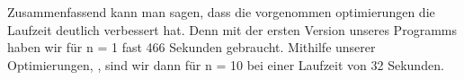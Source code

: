 Zusammenfassend kann man sagen, dass die vorgenommen optimierungen die Laufzeit deutlich verbessert hat.
Denn mit der ersten Version unseres Programms haben wir für n = 1 fast 466 Sekunden gebraucht.
Mithilfe unserer Optimierungen, , sind wir dann für n = 10 bei einer Laufzeit von 32 Sekunden.
